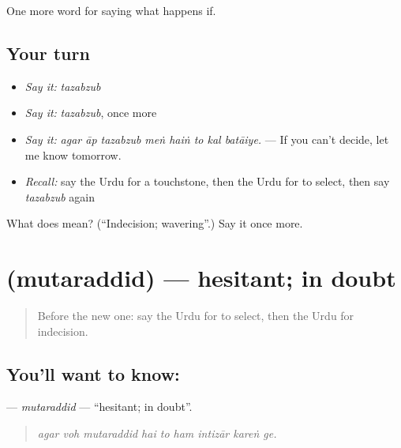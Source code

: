 \begin{grammarlens}[title={What you've built}]
One more word for saying what happens if.
\end{grammarlens}

\subsection*{Your turn}
\begin{itemize}
\raggedright
  \item \emph{Say it:} \emph{tazabzub}
  \item \emph{Say it:} \emph{tazabzub}, once more
  \item \emph{Say it:} \emph{agar āp tazabzub meṅ haiṅ to kal batāiye.} — If you can't decide, let me know tomorrow.
  \item \emph{Recall:} say the Urdu for a touchstone, then the Urdu for to select, then say \emph{tazabzub} again
\end{itemize}

\begin{tcolorbox}[breakable,colback=teal!4,colframe=teal!35!black,title={Before you move on}]
What does  mean? (\textquotedblleft{}Indecision; wavering\textquotedblright{}.) Say it once more.
\end{tcolorbox}
\section[\texorpdfstring{\ur{متردد} (mutaraddid)}{متردد (mutaraddid)}]{ (mutaraddid) — hesitant; in doubt}

\label{lesson:UR-C538-mutaraddid}



\begin{quote}
Before the new one: say the Urdu for to select, then the Urdu for indecision.
\end{quote}

\subsection*{You'll want to know: }
\textbf{} — \emph{mutaraddid} — \textquotedblleft{}hesitant; in doubt\textquotedblright{}.

\begin{quote}
        
\end{quote}

\begin{quote}
\emph{agar voh mutaraddid hai to ham intizār kareṅ ge.}
\end{quote}

